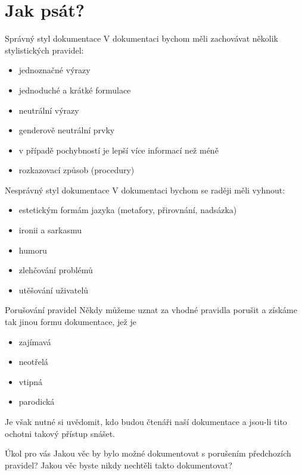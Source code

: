 \documentclass[12pt,a4paper]{beamer}
\begin{document}
	\section{Jak psát?}

	\begin{frame}{Správný styl dokumentace}
	V dokumentaci bychom měli zachovávat několik stylistických pravidel:
	\begin{itemize}
		\item jednoznačné výrazy
		\item jednoduché a krátké formulace
		\item neutrální výrazy
		\item genderově neutrální prvky
		\item v případě pochybností je lepší více informací než méně
		\item rozkazovací způsob (procedury)
	\end{itemize}
	\end{frame}

	\begin{frame}{Nesprávný styl dokumentace}
	V dokumentaci bychom se raději měli vyhnout:
	\begin{itemize}
		\item estetickým formám jazyka (metafory, přirovnání, nadsázka)
		\item ironii a sarkasmu
		\item humoru
		\item zlehčování problémů
		\item utěšování uživatelů
	\end{itemize}
	\end{frame}

	\begin{frame}{Porušování pravidel}
	Někdy můžeme uznat za vhodné pravidla porušit a získáme tak jinou formu dokumentace, jež je
	\begin{itemize}
		\item zajímavá
		\item neotřelá
		\item vtipná
		\item parodická
	\end{itemize}
	Je však nutné si uvědomit, kdo budou čtenáři naší dokumentace a jsou-li tito ochotni takový přístup snášet.
	\end{frame}

	\begin{frame}{Úkol pro vás}
			Jakou věc by bylo možné dokumentovat s porušením předchozích pravidel? Jakou věc byste nikdy nechtěli takto dokumentovat?
	\end{frame}
\end{document}
